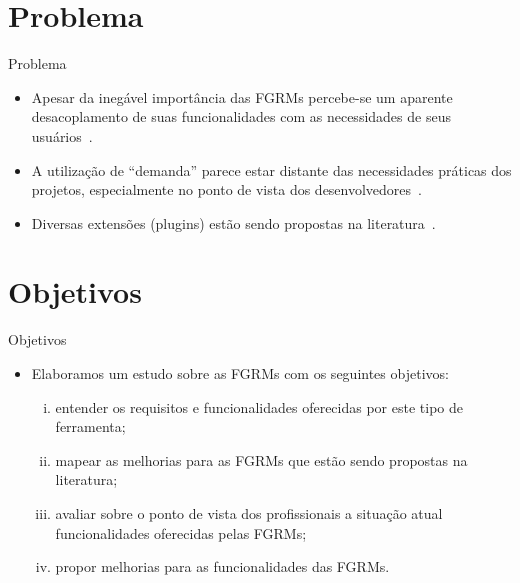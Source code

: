\documentclass[t,14pt,mathserif]{beamer}
\begin{document}
\section{Problema}

\begin{frame}{Problema}
	\begin{itemize}
        \item Apesar da inegável importância das FGRMs percebe-se um aparente
              desacoplamento de suas funcionalidades com as necessidades de seus
              usuários~\cite{baysal2012qualitative, just2008towards}.
        \item A utilização de  ``demanda'' parece estar distante das
              necessidades práticas dos projetos, especialmente no ponto de vista
              dos desenvolvedores~\cite{Baysal:2013:SAP:2486788.2486957}.
        \item Diversas extensões (plugins) estão sendo propostas na
            literatura~\cite{101186,Thung:2014:BIT:2635868.2661678,Kononenko:2014:DED:2591062.2591075}.
	\end{itemize}
\end{frame}

\section{Objetivos}

\begin{frame}{Objetivos}
	\begin{itemize}
        \item Elaboramos um estudo sobre as FGRMs com os seguintes objetivos:
            \begin{enumerate}[(i)]
                \item entender os requisitos e funcionalidades oferecidas por
                      este tipo de ferramenta;
                \item mapear as melhorias para as FGRMs que estão sendo
                      propostas na literatura;
                \item avaliar sobre o ponto de vista dos profissionais a
                      situação atual funcionalidades oferecidas pelas FGRMs\@;
                \item propor melhorias para as funcionalidades das FGRMs\@.
            \end{enumerate}
	\end{itemize}
\end{frame}
\end{document}
